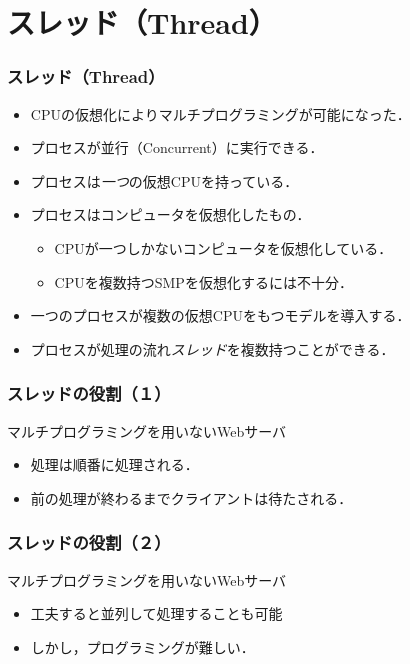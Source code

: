 \documentclass[unicode]{beamer}                   %
\begin{document}
\section{スレッド（Thread）}
\begin{frame}
  \frametitle{スレッド（Thread）}
  \begin{itemize}
    \item CPUの仮想化によりマルチプログラミングが可能になった．
    \item プロセスが並行（Concurrent）に実行できる．
    \item プロセスは\emph{一つ}の仮想CPUを持っている．
    \item プロセスはコンピュータを仮想化したもの．
      \begin{itemize}
      \item CPUが一つしかないコンピュータを仮想化している．
      \item CPUを複数持つSMPを仮想化するには不十分．
      \end{itemize}
    \item 一つのプロセスが複数の仮想CPUをもつモデルを導入する．
    \item プロセスが処理の流れ\emph{スレッド}を複数持つことができる．
  \end{itemize}
  \vfill
\end{frame}

\begin{frame}
  \frametitle{スレッドの役割（１）}
  マルチプログラミングを用いないWebサーバ \\
  \vfill
  \vfill
  \begin{itemize}
  \item 処理は順番に処理される．
  \item 前の処理が終わるまでクライアントは待たされる．
  \end{itemize}
  \vfill
\end{frame}

\begin{frame}
  \frametitle{スレッドの役割（２）}
  マルチプログラミングを用いないWebサーバ \\
  \vfill
  \vfill
  \begin{itemize}
  \item 工夫すると並列して処理することも可能
  \item しかし，プログラミングが難しい．
  \end{itemize}
  \vfill
\end{frame}
\end{document}
